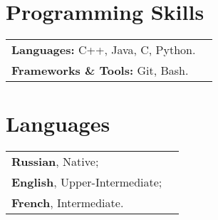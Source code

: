\documentclass[letterpaper,10pt]{article}
\newcommand{\resumeSubHeadingListStart}{\begin{itemize}[leftmargin=*]}
\newcommand{\resumeSubHeadingListEnd}{\end{itemize}}
\begin{document}
\vspace{-1pt}
\section{Programming Skills}
 \resumeSubHeadingListStart
 \begin{tabular}{ll}
\textbf{Languages:} \quad\quad\quad\quad\quad\quad C++, Java, C, Python. \\
\textbf{Frameworks \& Tools:} \quad Git, Bash. 
\end{tabular}
 \resumeSubHeadingListEnd

\vspace{-1pt}
\section{Languages}
\resumeSubHeadingListStart
 \begin{tabular}{ll}
\textbf{Russian}, Native; \\
\textbf{English}, Upper-Intermediate; \\
\textbf{French}, Intermediate.
\end{tabular}
 \resumeSubHeadingListEnd
  
\end{document}
